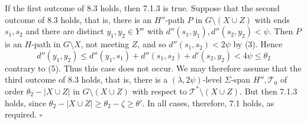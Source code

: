 If the first outcome of 8.3 holds, then 7.1.3 is true. Suppose that the second outcome of 8.3 holds, that is, there is an $H''$-path $P$ in $G \setminus (X \cup Z)$ with ends $s_1, s_2$ and there are distinct $y_1, y_2 \in Y''$ with $d''(s_1, y_1), d''(s_2, y_2) < \psi$. Then $P$ is an $H$-path in $G \setminus X$, not meeting $Z$, and so $d''(s_1, s_2) < 2\psi$ by (3). Hence
\begin{equation*}
d''(y_1, y_2) \le d''(y_1, s_1) + d''(s_1, s_2) + d'(s_2, y_2) < 4\psi \le \theta_2
\end{equation*}
contrary to (5). Thus this case does not occur. We may therefore assume that the third outcome of 8.3 holds, that is, there is a $(\lambda, 2\psi)$-level $\Sigma$-span $H'', \mathscr{T}_0$ of order $\theta_2 - |X \cup Z|$ in $G \setminus (X \cup Z)$ with respect to $\mathscr{T}^* \setminus (X \cup Z)$. But then 7.1.3 holds, since $\theta_2 - |X \cup Z| \ge \theta_2 - \zeta \ge \theta'$. In all cases, therefore, 7.1 holds, as required. $\square$
